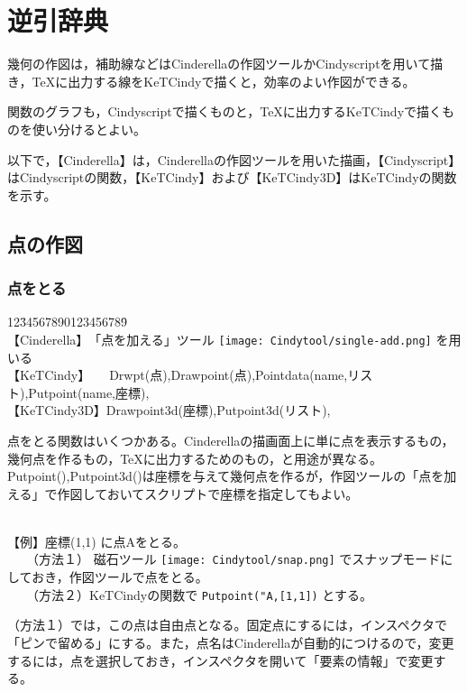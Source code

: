 \documentclass[papersize,a4paper,12pt,uplatex]{jsarticle}
\begin{document}
\section{逆引辞典}

幾何の作図は，補助線などはCinderellaの作図ツールかCindyscriptを用いて描き，TeXに出力する線をKeTCindyで描くと，効率のよい作図ができる。

関数のグラフも，Cindyscriptで描くものと，TeXに出力するKeTCindyで描くものを使い分けるとよい。

以下で，【Cinderella】は，Cinderellaの作図ツールを用いた描画，【Cindyscript】はCindyscriptの関数，【KeTCindy】および【KeTCindy3D】はKeTCindyの関数を示す。\\

\subsection{点の作図}
\subsubsection{点をとる}

\begin{tabbing}
12\=34567890123456789\=\kill\\

\>【Cinderella】　\>「点を加える」ツール \texttt{[image: Cindytool/single-add.png]} を用いる\\ 
 \>【KeTCindy】　　\>Drwpt(点),Drawpoint(点),Pointdata(name,リスト),Putpoint(name,座標),\\
 \>【KeTCindy3D】\>Drawpoint3d(座標),Putpoint3d(リスト),\\
\end{tabbing}

点をとる関数はいくつかある。Cinderellaの描画面上に単に点を表示するもの，幾何点を作るもの，TeXに出力するためのもの，と用途が異なる。
Putpoint(),Putpoint3d()は座標を与えて幾何点を作るが，作図ツールの「点を加える」で作図しておいてスクリプトで座標を指定してもよい。

　\\
【例】座標(1,1) に点Aをとる。\\
　　（方法１） 磁石ツール \texttt{[image: Cindytool/snap.png]} でスナップモードにしておき，作図ツールで点をとる。\\
　　（方法２）KeTCindyの関数で \verb|Putpoint("A,[1,1])| とする。

（方法１）では，この点は自由点となる。固定点にするには，インスペクタで「ピンで留める」にする。また，点名はCinderellaが自動的につけるので，変更するには，点を選択しておき，インスペクタを開いて「要素の情報」で変更する。
\end{document}
